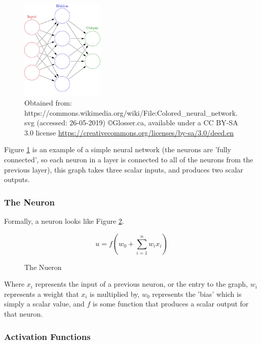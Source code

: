     \begin{figure}[h]
        \centering
        \includegraphics[width=150px]{../img/1000px-Colored_neural_network.png}
        \caption{Obtained from: https://commons.wikimedia.org/wiki/File:Colored\_neural\_network.svg (accessed: 26-05-2019) \copyright \space Glosser.ca, available under a CC BY-SA 3.0 license \url{https://creativecommons.org/licenses/by-sa/3.0/deed.en}}
        \label{fig:fcneuralnet}
    \end{figure}

    Figure \ref{fig:fcneuralnet} is an example of a simple neural network (the neurons are 'fully connected', so each neuron in a layer is connected to all of the neurons from the previous layer), this graph takes three scalar inputs, and produces two scalar outputs.

        \subsubsection{The Neuron}
        Formally, a neuron looks like Figure \ref{fig:theneuron}.
        \begin{figure}[h]
        \[
            u=f(w_0+\sum_{i=1}^nw_ix_i)
        \]
        \caption{The Nueron}
        \label{fig:theneuron}
        \end{figure}
        Where $x_i$ represents the input of a previous neuron, or the entry to the graph, $w_i$ represents a weight that $x_i$ is multiplied by, $w_0$ represents the 'bias' which is simply a scalar value, and $f$ is some function that produces a scalar output for that neuron.
        
        \subsubsection{Activation Functions}


